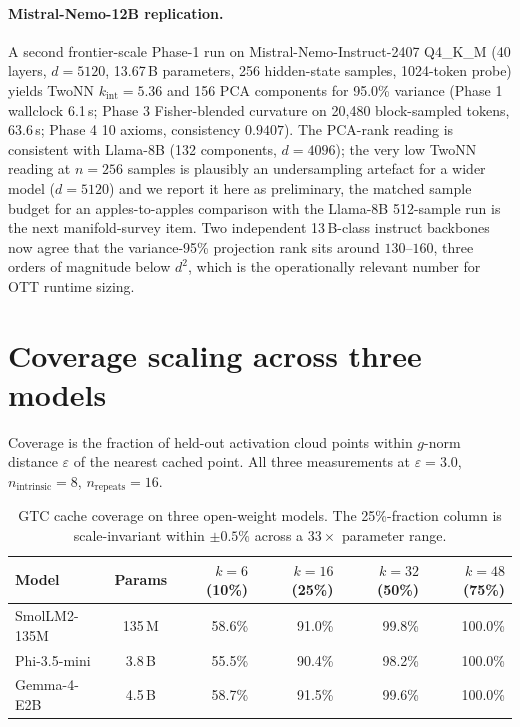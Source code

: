 \documentclass[11pt]{article}
\begin{document}
\paragraph{Mistral-Nemo-12B replication.}  A second frontier-scale Phase-1
run on Mistral-Nemo-Instruct-2407 Q4\_K\_M (40 layers, $d{=}5120$,
13.67\,B parameters, 256 hidden-state samples, 1024-token probe) yields
TwoNN $k_\text{int}{=}5.36$ and 156 PCA components for
95.0\% variance (Phase 1 wallclock 6.1\,s; Phase 3 Fisher-blended
curvature on 20{,}480 block-sampled tokens, 63.6\,s; Phase 4 10 axioms,
consistency $0.9407$).  The PCA-rank reading is consistent with
Llama-8B (132 components, $d{=}4096$); the very low TwoNN reading at
$n{=}256$ samples is plausibly an undersampling artefact for a wider
model ($d{=}5120$) and we report it here as preliminary, the matched
sample budget for an apples-to-apples comparison with the Llama-8B
512-sample run is the next manifold-survey item.  Two independent
13\,B-class instruct backbones now agree that the variance-95\%
projection rank sits around $130\text{--}160$, three orders of magnitude
below $d^2$, which is the operationally relevant number for OTT runtime
sizing.

\section{Coverage scaling across three models}
\label{sec:coverage}

Coverage is the fraction of held-out activation cloud points within $g$-norm
distance $\varepsilon$ of the nearest cached point. All three measurements at
$\varepsilon=3.0$, $n_{\mathrm{intrinsic}}=8$, $n_{\mathrm{repeats}}=16$.

\begin{table}[h]
\centering\small
\begin{tabular}{lcrrrr}
\toprule
Model & Params & $k=6$ (10\%) & $k=16$ (25\%) & $k=32$ (50\%) & $k=48$ (75\%)\\
\midrule
SmolLM2-135M & 135\,M & 58.6\% & 91.0\% & 99.8\% & 100.0\%\\
Phi-3.5-mini & 3.8\,B & 55.5\% & 90.4\% & 98.2\% & 100.0\%\\
Gemma-4-E2B  & 4.5\,B & 58.7\% & 91.5\% & 99.6\% & 100.0\%\\
\bottomrule
\end{tabular}
\caption{GTC cache coverage on three open-weight models. The 25\%-fraction
column is scale-invariant within $\pm 0.5\%$ across a $33\times$ parameter
range.}
\end{table}
\end{document}
